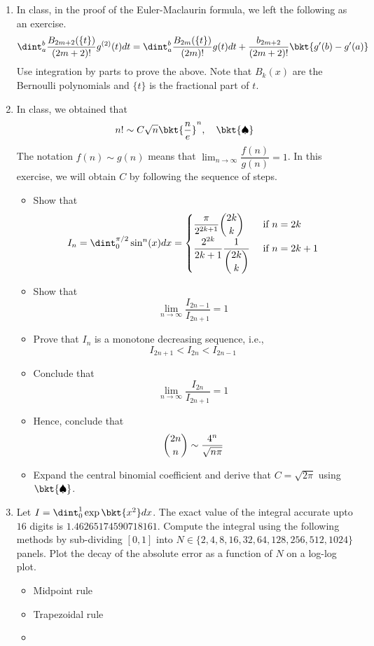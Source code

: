 \documentclass{article}
\begin{document}
	\begin{enumerate}
		\item
		In class, in the proof of the Euler-Maclaurin formula, we left the following as an exercise.
		$$\dint_a^b \dfrac{B_{2m+2}(\{t\})}{(2m+2)!} g^{(2)}(t)dt = \dint_a^b \dfrac{B_{2m}(\{t\})}{(2m)!} g(t)dt + \dfrac{b_{2m+2}}{(2m+2)!} \bkt{g'(b)-g'(a)}$$
		Use integration by parts to prove the above. Note that $B_k(x)$ are the Bernoulli polynomials and $\{t\}$ is the fractional part of $t$.
		\item
		In class, we obtained that
		$$n! \sim C \sqrt{n} \bkt{\dfrac{n}{e}}^n, \,\,\,\,\,\, \bkt{\spadesuit}$$
		The notation $f(n) \sim g(n)$ means that $\lim_{n \to \infty} \dfrac{f(n)}{g(n)} = 1$. In this exercise, we will obtain $C$ by following the sequence of steps.
		\begin{itemize}
			\item
			Show that
			$$I_n=\dint_0^{\pi/2} \sin^{n}(x)dx = \begin{cases}
			\dfrac{\pi}{2^{2k+1}} \dbinom{2k}k & \text{ if $n=2k$}\\
			\dfrac{2^{2k}}{2k+1} \dfrac1{\dbinom{2k}k} & \text{ if $n=2k+1$}\\
			\end{cases}$$
			\item
			Show that
			$$\lim_{n \to \infty}\dfrac{I_{2n-1}}{I_{2n+1}} = 1$$
			\item
			Prove that $I_n$ is a monotone decreasing sequence, i.e.,
			$$I_{2n+1} < I_{2n} < I_{2n-1}$$
			\item
			Conclude that
			$$\lim_{n \to \infty}\dfrac{I_{2n}}{I_{2n+1}} = 1$$
			\item
			Hence, conclude that
			$$\dbinom{2n}n \sim \dfrac{4^n}{\sqrt{n \pi}}$$
			\item
			Expand the central binomial coefficient and derive that $C = \sqrt{2\pi}$ using $\bkt{\spadesuit}$.
		\end{itemize}
		\item
		Let $I = \dint_0^1 \exp\bkt{x^2}dx$. The exact value of the integral accurate upto $16$ digits is $1.46265174590718161$. Compute the integral using the following methods by sub-dividing $[0,1]$ into $N \in \{2,4,8,16,32,64,128,256,512,1024\}$ panels. Plot the decay of the absolute error as a function of $N$ on a log-log plot.
		\begin{itemize}
			\item
			Midpoint rule
			\item
			Trapezoidal rule
			\item

\end{itemize}
\end{enumerate}
\end{document}
